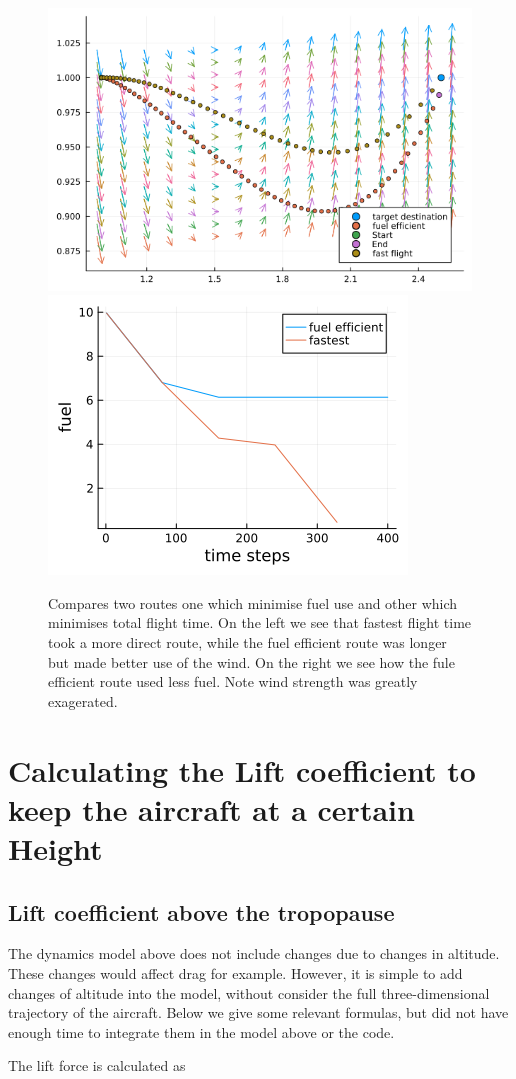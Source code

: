 \documentclass{article}
\begin{document}
\begin{figure}
    \centering
    \includegraphics[width = 0.59\linewidth]{readme-5.png}
    \includegraphics[width = 0.4\linewidth]{readme-6.png}
\caption{Compares two routes one which minimise fuel use and other which minimises total flight time. On the left we see that fastest flight time took a more direct route, while the fuel efficient route was longer but made better use of the wind. On the right we see how the fule efficient route used less fuel. Note wind strength was greatly exagerated.}
\label{fig:compare-routes}
\end{figure}


\section{Calculating the Lift coefficient to keep the aircraft at a certain Height}

\subsection{Lift coefficient above the tropopause}

The dynamics model above does not include changes due to changes in altitude. These changes would affect drag for example. However, it is simple to add changes of altitude into the model, without consider the full three-dimensional trajectory of the aircraft. Below we give some relevant formulas, but did not have enough time to integrate them in the model above or the code.  

The lift force is calculated as  \cite{nuic2004bada} 
\end{document}
